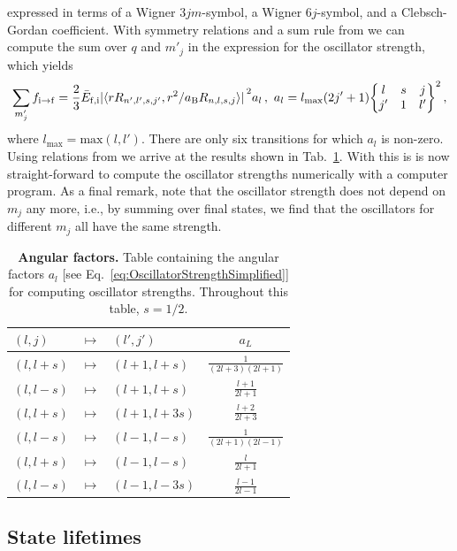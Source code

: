\documentclass[fontsize=12pt,
               twoside=false,
               BCOR=0mm,
               DIV=14,
               overfullrule=true, %
               toc=bibliography,
               headinclude=true,
               footinclude=false]{scrartcl}
\numberwithin{equation}{section}
\newcommand{\aB}{a_\mathrm{B}}
\def\TabAngularFactors{
    \begin{table}[t]
        \centering
        \begin{tabular}{lllc}
            \toprule
            $(l,j)$ & $\mapsto$ & $(l',j')$ & $a_L$ \\
            \midrule
            $(l,l+s)$ & $\mapsto$ & $(l+1,l+s)$  & $\frac{1}{(2l+3)(2l+1)}$ \\
            $(l,l-s)$ & $\mapsto$ & $(l+1,l+s)$  & $\frac{l+1}{2l+1}$       \\
            $(l,l+s)$ & $\mapsto$ & $(l+1,l+3s)$ & $\frac{l+2}{2l+3}$       \\
            $(l,l-s)$ & $\mapsto$ & $(l-1,l-s)$  & $\frac{1}{(2l+1)(2l-1)}$ \\
            $(l,l+s)$ & $\mapsto$ & $(l-1,l-s)$  & $\frac{l}{2l+1}$         \\
            $(l,l-s)$ & $\mapsto$ & $(l-1,l-3s)$ & $\frac{l-1}{2l-1}$       \\
            \bottomrule
        \end{tabular}
        \caption{\textbf{Angular factors.} Table containing the angular factors
                 $a_l$ [see Eq.~\eqref{eq:OscillatorStrengthSimplified}] for
                 computing oscillator strengths. Throughout this table,
                 $s=1\slash{2}$.}
        \label{tab:AngularFactors}
    \end{table}
}
\begin{document}
    expressed in terms of a Wigner $3jm$-symbol, a Wigner $6j$-symbol, and a
    Clebsch-Gordan coefficient. With symmetry relations and a sum rule from
    \cite[p.~236,259]{varshalovic1988} we can compute the sum over $q$ and
    $m'_j$ in the expression for the oscillator strength, which yields
    \begin{equation}\label{eq:OscillatorStrengthSimplified}
        \sum_{m'_j} f_{\mathrm{i}\to\mathrm{f}}
        =
        \frac{2}{3} \bar{E}_\mathrm{f,i}
        \abs*{\langle r R_{n',l',s,j'}, r^2\slash\aB R_{n,l,s,j} \rangle}^2
        a_l
    \,, \
        a_l
        =
        l_\mathrm{max} (2j'+1)
        \bigg\{\mqty{l & s & j \\ j' & 1 & l'}\bigg\}^2
    \,,
    \end{equation}
    where $l_\mathrm{max}=\mathrm{max}(l,l')$. There are only six transitions
    for which $a_l$ is non-zero. Using relations from
    \cite[p.~298,300]{varshalovic1988} we arrive at the results shown in
    Tab.~\ref{tab:AngularFactors}. With this is is now straight-forward to
    compute the oscillator strengths numerically with a computer program. As a
    final remark, note that the oscillator strength does not depend on $m_j$ any
    more, i.e., by summing over final states, we find that the oscillators for
    different $m_j$ all have the same strength.

    \TabAngularFactors

    \subsection{State lifetimes}
    \label{subsec:StateLifetimes}
\end{document}

